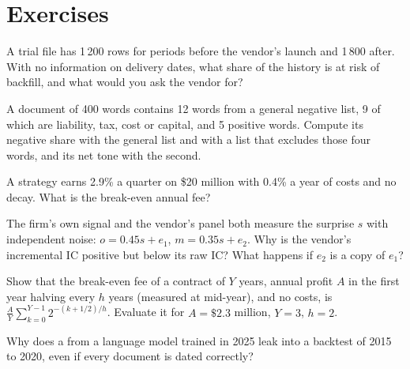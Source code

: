 \section{Exercises}

\begin{exercise}[$\star$]\label{exo:rs:alternative-and-text-data:1}
A trial file has 1\,200 rows for periods before the vendor's launch and 1\,800 after. With no information on delivery dates, what share of the
history is at risk of backfill, and what would you ask the vendor for?
\end{exercise}

\begin{exercise}[$\star$]\label{exo:rs:alternative-and-text-data:2}
A document of 400 words contains 12 words from a general negative list, 9 of which are liability, tax, cost or capital, and 5 positive words.
Compute its negative share with the general list and with a list that excludes those four words, and its net tone with the second.
\end{exercise}

\begin{exercise}[$\star$]\label{exo:rs:alternative-and-text-data:3}
A strategy earns 2.9\% a quarter on \$20 million with 0.4\% a year of costs and no decay. What is the break-even annual fee?
\end{exercise}

\begin{exercise}[$\star\star$]\label{exo:rs:alternative-and-text-data:4}
The firm's own signal and the vendor's panel both measure the surprise $s$ with independent noise: $o = 0.45s + e_1$, $m = 0.35s + e_2$. Why is
the vendor's incremental IC positive but below its raw IC? What happens if $e_2$ is a copy of $e_1$?
\end{exercise}

\begin{exercise}[$\star\star$]\label{exo:rs:alternative-and-text-data:5}
Show that the break-even fee of a contract of $Y$ years, annual profit $A$ in the first year halving every $h$ years (measured at mid-year), and no
costs, is $\frac{A}{Y}\sum_{k=0}^{Y-1} 2^{-(k+1/2)/h}$. Evaluate it for $A = \$2.3$ million, $Y = 3$, $h = 2$.
\end{exercise}

\begin{exercise}[$\star\star$]\label{exo:rs:alternative-and-text-data:6}
Why does a  from a language model trained in 2025 leak into a backtest of 2015 to 2020, even if every document is dated
correctly?
\end{exercise}

